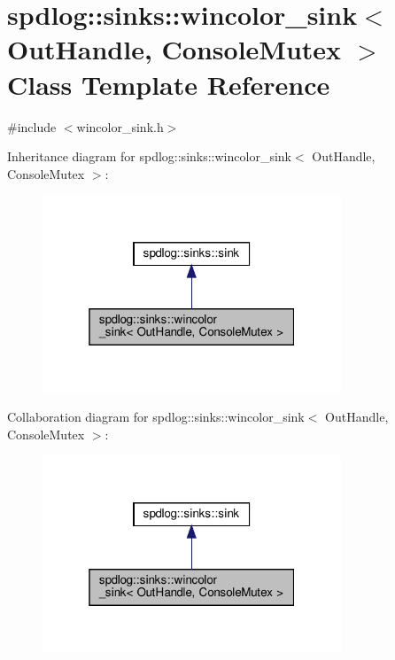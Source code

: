 \hypertarget{classspdlog_1_1sinks_1_1wincolor__sink}{}\section{spdlog\+:\+:sinks\+:\+:wincolor\+\_\+sink$<$ Out\+Handle, Console\+Mutex $>$ Class Template Reference}
\label{classspdlog_1_1sinks_1_1wincolor__sink}


{\ttfamily \#include $<$wincolor\+\_\+sink.\+h$>$}



Inheritance diagram for spdlog\+:\+:sinks\+:\+:wincolor\+\_\+sink$<$ Out\+Handle, Console\+Mutex $>$\+:
\nopagebreak
\begin{figure}[H]
\begin{center}
\leavevmode
\includegraphics[width=253pt]{classspdlog_1_1sinks_1_1wincolor__sink__inherit__graph}
\end{center}
\end{figure}


Collaboration diagram for spdlog\+:\+:sinks\+:\+:wincolor\+\_\+sink$<$ Out\+Handle, Console\+Mutex $>$\+:
\nopagebreak
\begin{figure}[H]
\begin{center}
\leavevmode
\includegraphics[width=253pt]{classspdlog_1_1sinks_1_1wincolor__sink__coll__graph}
\end{center}
\end{figure}

